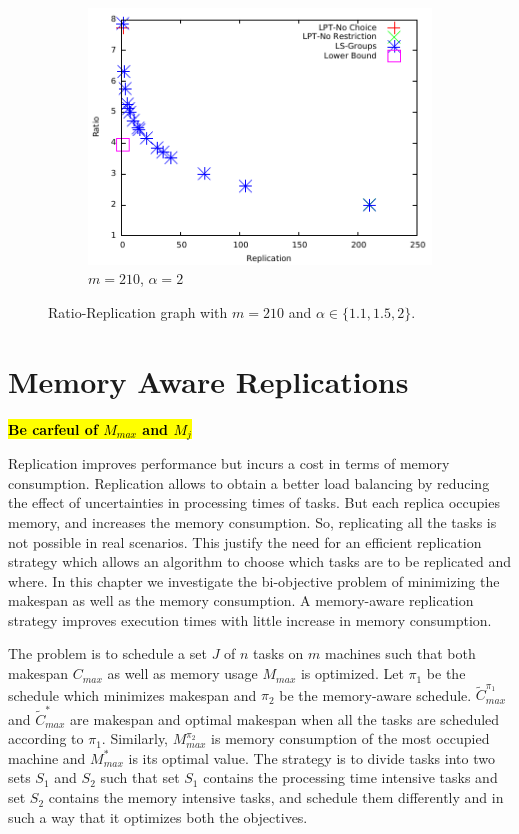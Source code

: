 \documentclass[twocolumn]{svjour3}
\newcommand{\todo}[1]{{\color{red}\textbf{\hl{#1}}\xspace}}
\begin{document}
\begin {figure}
  \begin{subfigure}[b]{0.5\textwidth}
    \includegraphics[width=\textwidth]{alpha_2.pdf}
    \caption{$m=210$, $\alpha=2$}
    \label{fig:3}
  \end{subfigure} %

  \caption{Ratio-Replication graph with $m=210$ and $\alpha \in \{1.1, 1.5, 2\}$.}
  \label{fig:Graph}
\end{figure}


\section{Memory Aware Replications}\label{ch5}
   
\todo{Be carfeul of $M_{max}$ and $M_j$}
   
Replication improves performance but incurs a cost in terms of memory
consumption.  Replication allows to obtain a better load balancing by
reducing the effect of uncertainties in processing times of tasks. But
each replica occupies memory, and increases the memory consumption.
So, replicating all the tasks is not possible in real scenarios. This
justify the need for an efficient replication strategy which allows an
algorithm to choose which tasks are to be replicated and where.  In
this chapter we investigate the bi-objective problem of minimizing the
makespan as well as the memory consumption. A memory-aware replication
strategy improves execution times with little increase in memory
consumption.
   
The problem is to schedule a set $J$ of $n$ tasks on $m$ machines such
that both makespan $C_{max}$ as well as memory usage $M_{max}$ is
optimized.  Let $\pi_1$ be the schedule which minimizes makespan and
$\pi_2$ be the memory-aware schedule. $\tilde{C}^{\pi_1}_{max}$ and
$\tilde{C}^{*}_{max}$ are makespan and optimal makespan when all the
tasks are scheduled according to $\pi_1$. Similarly, $M^{\pi_2}_{max}$
is memory consumption of the most occupied machine and $M^*_{max}$ is
its optimal value. The strategy is to divide tasks into two sets $S_1$
and $S_2$ such that set $S_1$ contains the processing time intensive
tasks and set $S_2$ contains the memory intensive tasks, and schedule
them differently and in such a way that it optimizes both the
objectives.
     
\end{document}
